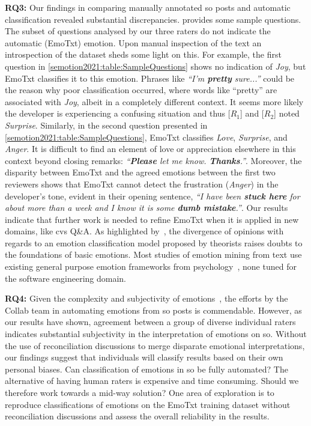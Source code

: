 \textbf{RQ3:} Our findings in comparing manually annotated \gls{so} posts and automatic classification revealed substantial discrepancies.  provides some sample questions. The subset of questions analysed by our three raters do not indicate the automatic (EmoTxt) emotion. Upon manual inspection of the text an introspection of the dataset sheds some light on this. For example, the first question in \cref{semotion2021:table:SampleQuestions} shows no indication of \textit{Joy}, but EmoTxt classifies it to this emotion. Phrases like \textit{``I'm \textbf{pretty} sure...''} could be the reason why poor classification occurred, where words like ``pretty'' are associated with \textit{Joy}, albeit in a completely different context. It seems more likely the developer is experiencing a confusing situation and thus {[$R_{1}$]} and {[$R_{2}$]} noted \textit{Surprise}.  Similarly, in the second question presented in \cref{semotion2021:table:SampleQuestions}, EmoTxt classifies \textit{Love}, \textit{Surprise}, and \textit{Anger}. It is difficult to find an element of love or appreciation elsewhere in this context beyond closing remarks: \textit{``\textbf{Please} let me know. \textbf{Thanks}.''}. Moreover, the disparity between EmoTxt and the agreed emotions between the first two reviewers shows that EmoTxt cannot detect the frustration (\textit{Anger}) in the developer's tone, evident in their opening sentence, \textit{``I have been \textbf{stuck here} for about more than a week and I know it is some \textbf{dumb mistake}.''}. Our results indicate that further work is needed to refine EmoTxt when it is applied in new domains, like \gls{cvs} Q\&A. As highlighted by~\citet{curumsing2017}, the divergence of opinions with regards to an emotion classification model proposed by theorists raises doubts to the foundations of basic emotions. Most studies of  emotion mining from text use existing general purpose emotion frameworks from psychology~\citep{Ondrej:2016, ortu2016, novielli2018}, none tuned for the software engineering domain.

\textbf{RQ4:} Given the complexity and subjectivity of emotions~\citep{curumsing2017}, the efforts by the Collab team in automating emotions from \gls{so} posts is commendable. However, as our results have shown, agreement between a group of diverse individual raters indicates substantial subjectivity in the interpretation of emotions on \gls{so}. Without the use of reconciliation discussions to merge disparate emotional interpretations, our findings suggest that individuals will classify results based on their own personal biases.  Can classification of emotions in \gls{so} be fully automated? The alternative of having human raters is expensive and time consuming. Should we therefore work towards a mid-way solution?  One area of exploration is to reproduce classifications of emotions on the EmoTxt training dataset without reconciliation discussions and assess the overall reliability in the results.



